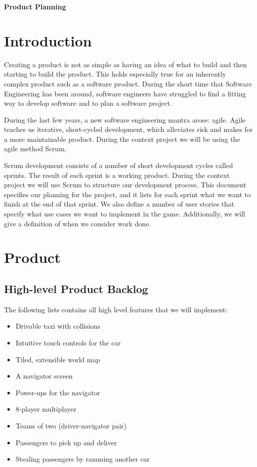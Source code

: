 \documentclass{article}
\begin{document}
\begin{minipage}[H]{\textwidth}
\vspace{0.3cm}
		\begin{center}
		
		\vspace{0.3cm}
			\Huge{\textbf{Product Planning}}\\
		\vspace{0.3cm}	
		
		\vspace{0.7cm}	
		\end{center}
\end{minipage}

\tableofcontents
\pagebreak
\section{Introduction}
Creating a product is not as simple as having an idea of what to build and then starting to build the product. This holds especially true for an inherently complex product such as a software product. During the short time that Software Engineering has been around, software engineers have struggled to find a fitting way to develop software and to plan a software project.

During the last few years, a new software engineering mantra arose: agile. Agile teaches us iterative, short-cycled development, which alleviates risk and makes for a more maintainable product. During the context project we will be using the agile method Scrum.

Scrum development consists of a number of short development cycles called sprints. The result of each sprint is a working product. During the context project we will use Scrum to structure our development process. This document specifies our planning for the project, and it lists for each sprint what we want to finish at the end of that sprint. We also define a number of user stories that specify what use cases we want to implement in the game. Additionally, we will give a definition of when we consider work done.
\section{Product}
\subsection{High-level Product Backlog}
The following lists contains all high level features that we will implement:
\begin{itemize}
\item Drivable taxi with collisions
\item Intuitive touch controls for the car
\item Tiled, extensible world map
\item A navigator screen
\item Power-ups for the navigator
\item 8-player multiplayer
\item Teams of two (driver-navigator pair)
\item Passengers to pick up and deliver
\item Stealing passengers by ramming another car
\end{itemize}
\end{document}
